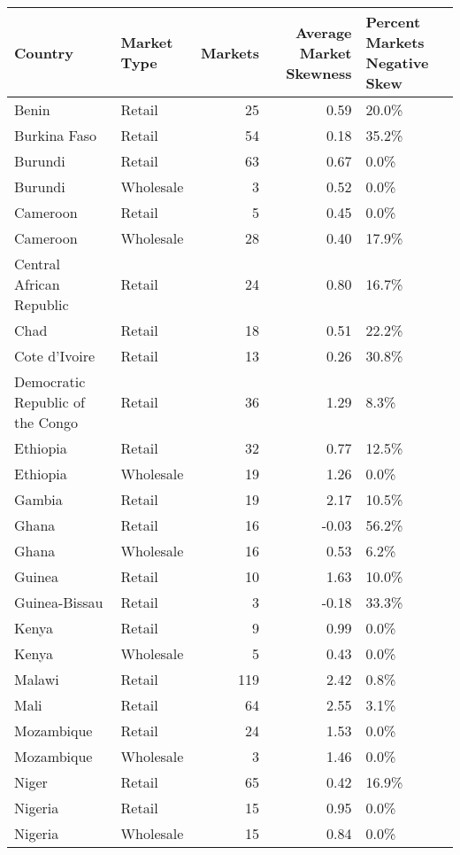 \begin{table}[ht]
\centering
\begin{tabular}{llrrl}
  \hline
Country & Market Type & Markets & Average Market Skewness  & Percent Markets Negative Skew \\ 
  \hline
Benin & Retail &  25 & 0.59 & 20.0\% \\ 
  Burkina Faso & Retail &  54 & 0.18 & 35.2\% \\ 
  Burundi & Retail &  63 & 0.67 & 0.0\% \\ 
  Burundi & Wholesale &   3 & 0.52 & 0.0\% \\ 
  Cameroon & Retail &   5 & 0.45 & 0.0\% \\ 
  Cameroon & Wholesale &  28 & 0.40 & 17.9\% \\ 
  Central African Republic & Retail &  24 & 0.80 & 16.7\% \\ 
  Chad & Retail &  18 & 0.51 & 22.2\% \\ 
  Cote d'Ivoire & Retail &  13 & 0.26 & 30.8\% \\ 
  Democratic Republic of the Congo & Retail &  36 & 1.29 & 8.3\% \\ 
  Ethiopia & Retail &  32 & 0.77 & 12.5\% \\ 
  Ethiopia & Wholesale &  19 & 1.26 & 0.0\% \\ 
  Gambia & Retail &  19 & 2.17 & 10.5\% \\ 
  Ghana & Retail &  16 & -0.03 & 56.2\% \\ 
  Ghana & Wholesale &  16 & 0.53 & 6.2\% \\ 
  Guinea & Retail &  10 & 1.63 & 10.0\% \\ 
  Guinea-Bissau & Retail &   3 & -0.18 & 33.3\% \\ 
  Kenya & Retail &   9 & 0.99 & 0.0\% \\ 
  Kenya & Wholesale &   5 & 0.43 & 0.0\% \\ 
  Malawi & Retail & 119 & 2.42 & 0.8\% \\ 
  Mali & Retail &  64 & 2.55 & 3.1\% \\ 
  Mozambique & Retail &  24 & 1.53 & 0.0\% \\ 
  Mozambique & Wholesale &   3 & 1.46 & 0.0\% \\ 
  Niger & Retail &  65 & 0.42 & 16.9\% \\ 
  Nigeria & Retail &  15 & 0.95 & 0.0\% \\ 
  Nigeria & Wholesale &  15 & 0.84 & 0.0\% \\ 

\end{tabular}
\end{table}
